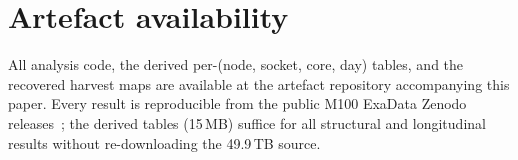 \documentclass[10pt,conference]{IEEEtran}
\begin{document}
\section*{Artefact availability}
All analysis code, the derived per-(node, socket, core, day) tables, and the recovered harvest maps
are available at the artefact repository accompanying this paper. Every result is reproducible from
the public M100 ExaData Zenodo releases~\cite{borghesi2023m100}; the derived tables (15\,MB)
suffice for all structural and longitudinal results without re-downloading the 49.9\,TB source.



\end{document}
